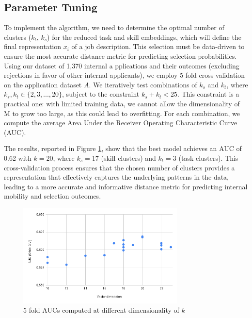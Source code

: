 \subsection{Parameter Tuning} 

To implement the algorithm, we need to determine the optimal number of clusters ($k_t$, $k_s$) for the reduced task and 
skill embeddings, which will define the final representation $x_i$ of a job description. This selection must be data-driven 
to ensure the most accurate distance metric for predicting selection probabilities. Using our dataset of 1,370 internal a
pplications and their outcomes (excluding rejections in favor of other internal applicants), we employ 5-fold cross-validation 
on the application dataset $A$. We iteratively test combinations of $k_s$ and $k_t$, where $k_s, k_t \in \{2, 3, ..., 20\}$, 
subject to the constraint $k_s + k_t < 25$. This constraint is a practical one: with limited training data, we cannot allow 
the dimensionality of M to grow too large, as this could lead to overfitting. For each combination, we compute the average 
Area Under the Receiver Operating Characteristic Curve (AUC).

The results, reported in Figure \ref{fig:AUC}, show that the best model achieves an AUC of 0.62 with $k = 20$, where 
$k_s = 17$ (skill clusters) and $k_t = 3$ (task clusters). This cross-validation process ensures that the chosen number 
of clusters provides a representation that effectively captures the underlying patterns in the data, leading to a more 
accurate and informative distance metric for predicting internal mobility and selection outcomes.  

\begin{figure}[htb]
    \centering
    \includegraphics[width=0.75\textwidth]{new_img/chart.png}
    \caption{5 fold AUCs computed at different dimensionality of $k$}
    \label{fig:AUC}
\end{figure}


